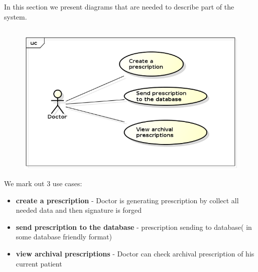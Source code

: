 
\chapter {}
In this section we present diagrams that are needed to describe part of the system.
\section{}
\begin{figure}[h]
\centering
\includegraphics[width=1\textwidth]{doctor/UseCases.png}
\end{figure} 
We mark out 3 use cases:

\begin{itemize}


\item \textbf{create a prescription} - Doctor is generating prescription by collect all needed data and then signature is forged
\item \textbf{send prescription to the database} - prescription sending to database( in some database friendly format)
\item \textbf{view archival prescriptions} - Doctor can check archival prescription of his current patient
\end{itemize}

